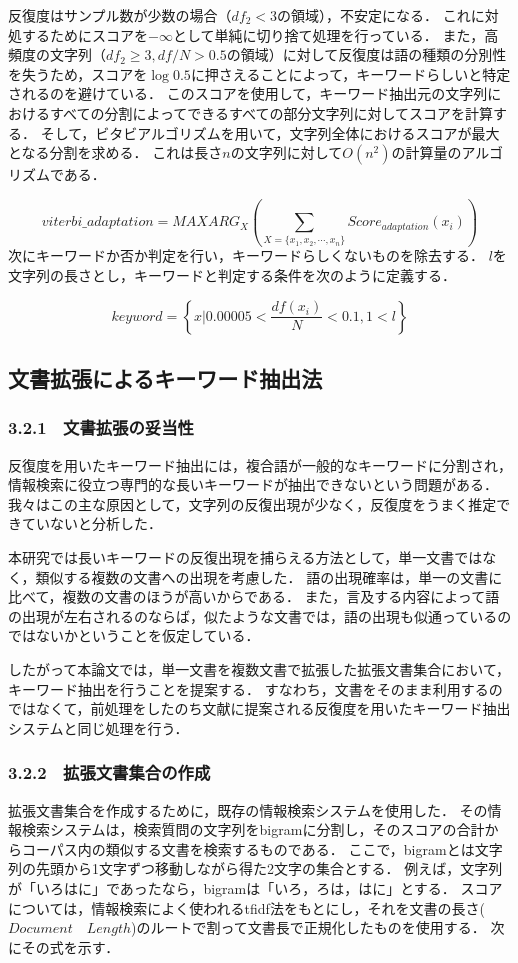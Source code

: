 \documentclass[japanese]{jnlp_1.2c}
\begin{document}
反復度はサンプル数が少数の場合（$df_2<3$の領域），不安定になる．
これに対処するためにスコアを$-\infty$として単純に切り捨て処理を行っている．
また，高頻度の文字列（$df_2\geq3,df/N>0.5$の領域）に対して反復度は語の種類の分別性を失うため，スコアを$\log 0.5$に押さえることによって，キーワードらしいと特定されるのを避けている．
このスコアを使用して，キーワード抽出元の文字列におけるすべての分割によってできるすべての部分文字列に対してスコアを計算する．
そして，ビタビアルゴリズムを用いて，文字列全体におけるスコアが最大となる分割を求める．
これは長さ$n$の文字列に対して$O(n^2)$の計算量のアルゴリズムである．

\[ viterbi\_adaptation = MAXARG_X \left( \sum_{X=\{x_1,x_2,\cdots,x_n\}} Score_{adaptation}(x_i) \right)\]
次にキーワードか否か判定を行い，キーワードらしくないものを除去する．
$l$を文字列の長さとし，キーワードと判定する条件を次のように定義する．

\[ keyword = \left\{x|0.00005<\frac{df(x_i)}{N}<0.1,1<l \right\} \]

\subsection{文書拡張によるキーワード抽出法}
\subsubsection{3.2.1　文書拡張の妥当性}
反復度を用いたキーワード抽出には，複合語が一般的なキーワードに分割され，情報検索に役立つ専門的な長いキーワードが抽出できないという問題がある．
我々はこの主な原因として，文字列の反復出現が少なく，反復度をうまく推定できていないと分析した．

本研究では長いキーワードの反復出現を捕らえる方法として，単一文書ではなく，類似する複数の文書への出現を考慮した．
語の出現確率は，単一の文書に比べて，複数の文書のほうが高いからである．
また，言及する内容によって語の出現が左右されるのならば，似たような文書では，語の出現も似通っているのではないかということを仮定している．

したがって本論文では，単一文書を複数文書で拡張した拡張文書集合において，キーワード抽出を行うことを提案する．
すなわち，文書をそのまま利用するのではなくて，前処理をしたのち文献\cite{TakedaAndUmemura2001}に提案される反復度を用いたキーワード抽出システムと同じ処理を行う．

\subsubsection{3.2.2　拡張文書集合の作成}
拡張文書集合を作成するために，既存の情報検索システムを使用した．
その情報検索システムは，検索質問の文字列をbigramに分割し，そのスコアの合計からコーパス内の類似する文書を検索するものである．
ここで，bigramとは文字列の先頭から1文字ずつ移動しながら得た2文字の集合とする．
例えば，文字列が「いろはに」であったなら，bigramは「いろ，ろは，はに」とする．
スコアについては，情報検索によく使われるtfidf法をもとにし，それを文書の長さ($Document \quad Length$)のルートで割って文書長で正規化したものを使用する．
次にその式を示す．
\clearpage
\end{document}
